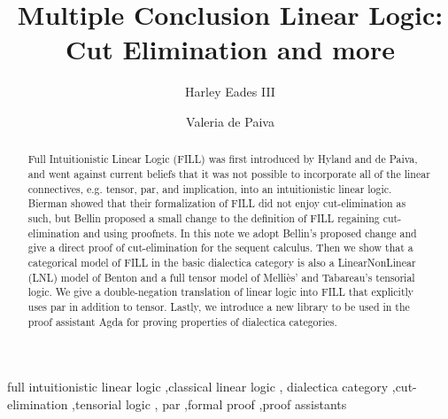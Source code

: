 \documentclass[preprint,12pt]{elsarticle}
\date{}
\begin{document}

\newcommand{\rcond}[0]{\refstepcounter{condCounter}\arabic{condCounter}}

\begin{frontmatter}
\title{Multiple Conclusion Linear Logic: \\ Cut Elimination and more}

\author[au]{Harley Eades III}

\author[nuance]{Valeria de Paiva}

\address[au]{Computer and Information Sciences, Augusta University, Augusta, GA}
\address[nuance]{Nuance Communications, Sunnyvale, CA}

\begin{abstract}
  Full Intuitionistic Linear Logic (FILL) was first introduced by
  Hyland and de Paiva, and went against current beliefs that it was
  not possible to incorporate all of the linear connectives,
  e.g. tensor, par, and implication, into an intuitionistic linear
  logic. Bierman showed that their formalization of FILL did not enjoy
  cut-elimination as such, but Bellin proposed a small change to the
  definition of FILL regaining cut-elimination and using proofnets.
  In this note we adopt Bellin's proposed change and give a direct
  proof of cut-elimination for the sequent calculus.  Then we show
  that a categorical model of FILL in the basic dialectica category is
  also a LinearNonLinear (LNL) model of Benton and a full tensor model
  of Melli\`es' and Tabareau's tensorial logic.  We give a
  double-negation translation of linear logic into FILL that
  explicitly uses par in addition to tensor.  Lastly, we introduce a
  new library to be used in the proof assistant Agda for proving
  properties of dialectica categories.
\end{abstract}

\begin{keyword}
full intuitionistic linear logic \sep classical linear logic \sep
dialectica category \sep cut-elimination \sep tensorial logic \sep
par \sep formal proof \sep proof assistants
\end{keyword}

\end{frontmatter}
\end{document}
